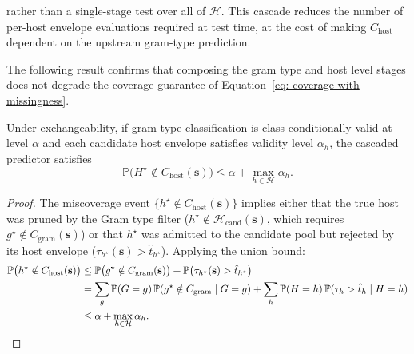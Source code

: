 rather than a single-stage test over all of $\mathcal{H}$. This cascade reduces the number of per-host envelope 
evaluations required at test time, at the cost of making $C_{\text{host}}$ dependent on the upstream gram-type 
prediction.

The following result confirms that composing the gram type and host level stages does not degrade the 
coverage guarantee of Equation~\eqref{eq: coverage with missingness}.

\begin{proposition}
\label{prop:cascade}
Under exchangeability, if gram type classification is class conditionally valid at level $\alpha$ and each candidate 
host envelope satisfies validity level $\alpha_h$, the cascaded predictor satisfies
\begin{equation}
\label{eq: cascade-bound}
\mathbb{P}\big(H^\star \notin C_{\text{host}}(\mathbf{s})\big) \le \alpha + \max_{h \in \mathcal{H}} \alpha_h.
\end{equation}
\end{proposition}

\begin{proof}
The miscoverage event $\{h^\star \notin C_{\text{host}}(\mathbf{s})\}$ implies either that the true host was pruned by the Gram 
type filter ($h^\star \notin \mathcal{H}_{\text{cand}}(\mathbf{s})$, which requires $g^\star \notin C_{\text{gram}}(\mathbf{s})$) 
or that $h^\star$ was admitted to the candidate pool but rejected by its host envelope ($\tau_{h^\star}(\mathbf{s}) > 
\hat{t}_{h^\star}$). Applying the union bound:
\begin{align*}
\mathbb{P}\big(h^\star \notin C_{\text{host}}(\mathbf{s})\big) &\le \mathbb{P}\big(g^\star \notin C_{\text{gram}}(\mathbf{s})\big) + \mathbb{P}\big(\tau_{h^\star}(\mathbf{s}) > \hat{t}_{h^\star}\big) \\
&= \sum_{g} \mathbb{P}(G=g)\,\mathbb{P}(g^\star \notin C_{\text{gram}} \mid G=g) + \sum_{h} \mathbb{P}(H=h)\,\mathbb{P}(\tau_h > \hat{t}_h \mid H=h) \\
&\le \alpha + \max_{h \in \mathcal{H}} \alpha_h. \qedhere
\end{align*}
\end{proof}



